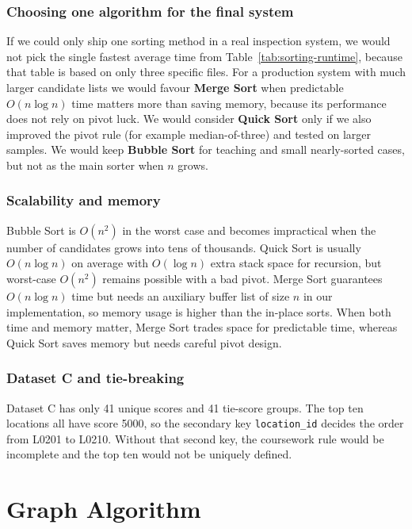 \documentclass[12pt,a4paper,twocolumn,openany]{report}
\begin{document}
\subsection{Choosing one algorithm for the final system}
If we could only ship one sorting method in a real inspection system, we would not pick the single fastest average time from Table~\ref{tab:sorting-runtime}, because that table is based on only three specific files. 
For a production system with much larger candidate lists we would favour \textbf{Merge Sort} when predictable $O(n \log n)$ time matters more than saving memory, because its performance does not rely on pivot luck. 
We would consider \textbf{Quick Sort} only if we also improved the pivot rule (for example median-of-three) and tested on larger samples. 
We would keep \textbf{Bubble Sort} for teaching and small nearly-sorted cases, but not as the main sorter when $n$ grows.

\subsection{Scalability and memory}
Bubble Sort is $O(n^2)$ in the worst case and becomes impractical when the number of candidates grows into tens of thousands. 
Quick Sort is usually $O(n \log n)$ on average with $O(\log n)$ extra stack space for recursion, but worst-case $O(n^2)$ remains possible with a bad pivot. 
Merge Sort guarantees $O(n \log n)$ time but needs an auxiliary buffer list of size $n$ in our implementation, so memory usage is higher than the in-place sorts. 
When both time and memory matter, Merge Sort trades space for predictable time, whereas Quick Sort saves memory but needs careful pivot design.

\subsection{Dataset C and tie-breaking}
Dataset C has only 41 unique scores and 41 tie-score groups. 
The top ten locations all have score 5000, so the secondary key \texttt{location\_id} decides the order from L0201 to L0210. 
Without that second key, the coursework rule would be incomplete and the top ten would not be uniquely defined.

\chapter{Graph Algorithm}
\end{document}
